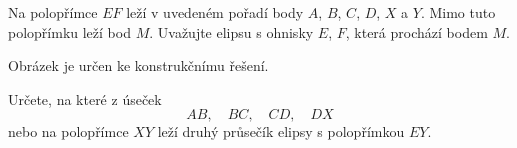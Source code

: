 \documentclass[12pt,a4paper]{article}
\begin{document}
\begin{exercise}

    Na polopřímce $EF$ leží v uvedeném pořadí body
    $A$, $B$, $C$, $D$, $X$ a $Y$. Mimo tuto polopřímku leží bod $M$.
    Uvažujte elipsu s ohnisky $E$, $F$, která prochází bodem $M$.

    Obrázek je určen ke konstrukčnímu řešení.

    \begin{center}
    \end{center}

    Určete, na které z úseček
    \[
        AB,\quad BC,\quad CD,\quad DX
    \]
    nebo na polopřímce $XY$ leží druhý průsečík elipsy s polopřímkou $EY$.

\end{exercise}


\end{document}
